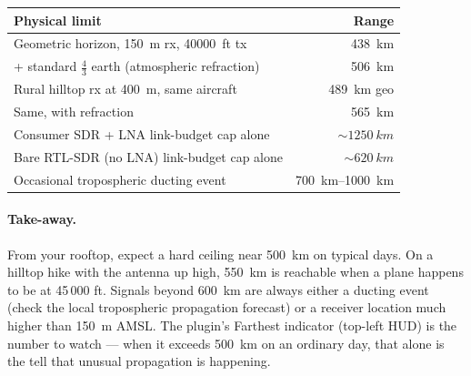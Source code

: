 \documentclass[11pt,a4paper]{article}
\begin{document}
\begin{center}
\begin{tabular}{l r}
\toprule
Physical limit                                                        & Range              \\
\midrule
Geometric horizon, \SI{150}{m} rx, \SI{40000}{ft} tx                  & \SI{438}{km}       \\
+ standard $\tfrac{4}{3}$ earth (atmospheric refraction)              & \SI{506}{km}       \\
Rural hilltop rx at \SI{400}{m}, same aircraft                         & \SI{489}{km} geo   \\
Same, with refraction                                                 & \SI{565}{km}       \\
Consumer SDR + LNA link-budget cap alone                              & $\sim\!\SI{1250}{km}$ \\
Bare RTL-SDR (no LNA) link-budget cap alone                           & $\sim\!\SI{620}{km}$  \\
Occasional tropospheric ducting event                                  & \SIrange{700}{1000}{km} \\
\bottomrule
\end{tabular}
\end{center}

\paragraph{Take-away.}
From your rooftop, expect a hard ceiling near \SI{500}{km} on typical
days.  On a hilltop hike with the antenna up high, \SI{550}{km} is
reachable when a plane happens to be at 45\,000 ft.  Signals beyond
\SI{600}{km} are always either a ducting event (check the local
tropospheric propagation forecast) or a receiver location much higher
than \SI{150}{m} AMSL.  The plugin's Farthest indicator (top-left HUD)
is the number to watch --- when it exceeds \SI{500}{km} on an ordinary
day, that alone is the tell that unusual propagation is happening.
\end{document}
